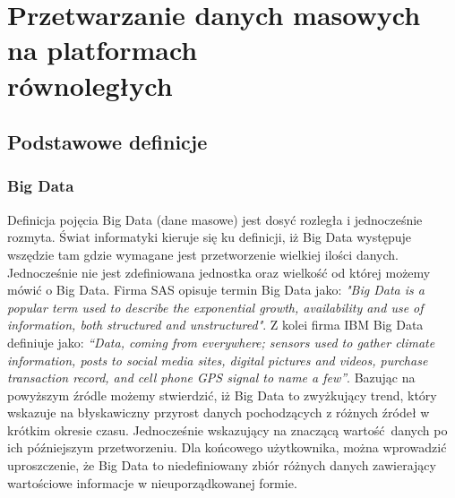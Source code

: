 \chapter{Przetwarzanie danych masowych na platformach\\równoległych} \label{chap.big-data-processing}

\section{Podstawowe definicje}
\subsection{Big Data}
Definicja pojęcia Big Data (dane masowe) jest dosyć rozległa i jednocześnie rozmyta. Świat informatyki kieruje się ku definicji, iż Big Data występuje wszędzie tam gdzie wymagane jest przetworzenie wielkiej ilości danych. Jednocześnie nie jest zdefiniowana jednostka oraz wielkość od której możemy mówić o Big Data. Firma SAS opisuje termin Big Data jako: \newline \textit{"Big Data is 
a  popular  term  used  to  describe  the  exponential  growth,  
availability  and  use  of  information,  both  structured  and  
unstructured"}. \newline Z kolei firma IBM Big Data definiuje jako: \textit{“Data, 
coming  from  everywhere;  sensors  used  to  gather  climate  
information,  posts  to  social  media  sites,  digital  pictures  
and  videos,  purchase  transaction  record,  and  cell  phone  
GPS signal to name a few”}\cite{big_data_concept}. Bazując na powyższym źródle możemy stwierdzić, iż Big Data to zwyżkujący trend, który wskazuje na błyskawiczny przyrost danych pochodzących z różnych źródeł w krótkim okresie czasu. Jednocześnie wskazujący na znaczącą wartość danych po ich późniejszym przetworzeniu. Dla końcowego użytkownika, można wprowadzić uproszczenie, że Big Data to niedefiniowany zbiór różnych danych zawierający wartościowe informacje w nieuporządkowanej formie.

